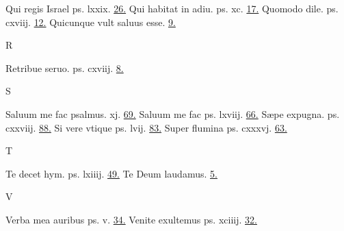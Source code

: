 \documentclass[a5paper,10pt]{book}
\def\ae{æ}
\begin{document}
\begin{multicols}{2}
\newline Qui regis Israel ps. lxxix. \hfill \hyperlink{ps79}{26.}
\newline Qui habitat in adiu. ps. xc. \hfill \hyperlink{ps90}{17.}
\newline Quomodo dile. ps. cxviij. \hfill \hyperlink{ps118.7}{12.}
\newline Quicunque vult saluus esse. \hfill \hyperlink{QUICVMQUE}{9.}
\newline \vspace{-1.75em}
\begin{center}
\color{red} R
\end{center}
\vspace{-.75em}
\par \noindent Retribue seruo. ps. cxviij. \hfill \hyperlink{ps118.2}{8.}
\newline \vspace{-1.75em}
\begin{center}
\color{red} S
\end{center}
\vspace{-.75em}
\par \noindent Saluum me fac psalmus. xj. \hfill \hyperlink{ps11}{69.}
\newline Saluum me fac ps. lxviij. \hfill \hyperlink{ps68}{66.}
\newline S\ae pe expugna. ps. cxxviij. \hfill \hyperlink{ps128}{88.}
\newline Si vere vtique ps. lvij. \hfill \hyperlink{ps57}{83.}
\newline Super flumina ps. cxxxvj. \hfill \hyperlink{ps136}{63.}
\newline \vspace{-1.75em}
\begin{center}
\color{red} T
\end{center}
\vspace{-.75em}
\par \noindent Te decet hym. ps. lxiiij. \hfill \hyperlink{ps64}{49.}
\newline Te Deum laudamus. \hfill \hyperlink{tedeum}{5.}
\newline \vspace{-1.75em}
\begin{center}
\color{red} V
\end{center}
\vspace{-.75em}
\par \noindent Verba mea auribus ps. v. \hfill \hyperlink{ps5}{34.}
\newline Venite exultemus ps. xciiij. \hfill \hyperlink{ps94}{32.}%

\end{multicols}
\end{document}
